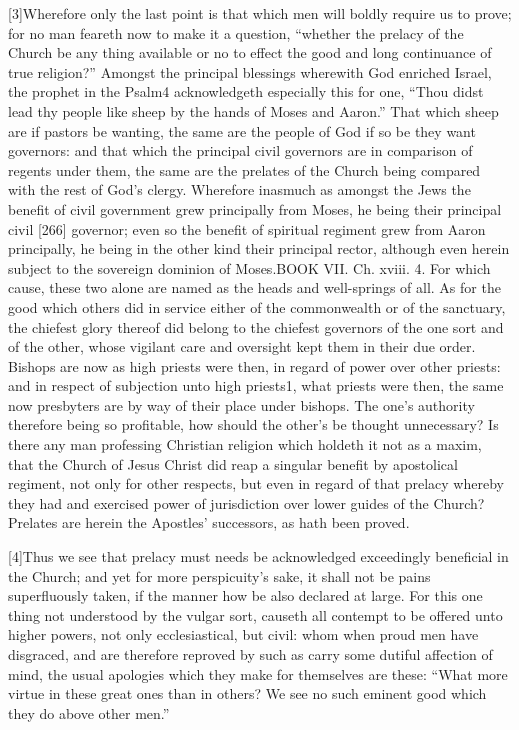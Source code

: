 [3]Wherefore only the last point is that which men will boldly require us to prove; for no man feareth now to make it a question, “whether the prelacy of the Church be any thing available or no to effect the good and long continuance of true religion?” Amongst the principal blessings wherewith God enriched Israel, the prophet in the Psalm4 acknowledgeth especially this for one, “Thou didst lead thy people like sheep by the hands of Moses and Aaron.” That which sheep are if pastors be wanting, the same are the people of God if so be they want governors: and that which the principal civil governors are in comparison of regents under them, the same are the prelates of the Church being compared with the rest of God’s clergy. Wherefore inasmuch as amongst the Jews the benefit of civil government grew principally from Moses, he being their principal civil [266] governor; even so the benefit of spiritual regiment grew from Aaron principally, he being in the other kind their principal rector, although even herein subject to the sovereign dominion of Moses.BOOK VII. Ch. xviii. 4. For which cause, these two alone are named as the heads and well-springs of all. As for the good which others did in service either of the commonwealth or of the sanctuary, the chiefest glory thereof did belong to the chiefest governors of the one sort and of the other, whose vigilant care and oversight kept them in their due order. Bishops are now as high priests were then, in regard of power over other priests: and in respect of subjection unto high priests1, what priests were then, the same now presbyters are by way of their place under bishops. The one’s authority therefore being so profitable, how should the other’s be thought unnecessary? Is there any man professing Christian religion which holdeth it not as a maxim, that the Church of Jesus Christ did reap a singular benefit by apostolical regiment, not only for other respects, but even in regard of that prelacy whereby they had and exercised power of jurisdiction over lower guides of the Church? Prelates are herein the Apostles’ successors, as hath been proved.

[4]Thus we see that prelacy must needs be acknowledged exceedingly beneficial in the Church; and yet for more perspicuity’s sake, it shall not be pains superfluously taken, if the manner how be also declared at large. For this one thing not understood by the vulgar sort, causeth all contempt to be offered unto higher powers, not only ecclesiastical, but civil: whom when proud men have disgraced, and are therefore reproved by such as carry some dutiful affection of mind, the usual apologies which they make for themselves are these: “What more virtue in these great ones than in others? We see no such eminent good which they do above other men.”

